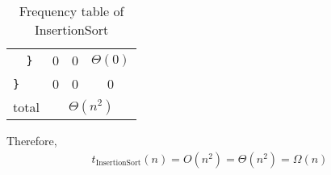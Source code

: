 \documentclass{article}
\begin{document}
\begin{table}[H]
\begin{tabular}{|l|c|c|c|}
        \verb|  }|                                        & 0                                   & 0               & $\Theta(0)$       \\
        \verb|}|                                          & 0                                   & 0               & 0                 \\
        \hline
        \multicolumn{1}{|c|}{total}                       & \multicolumn{3}{|c|}{$\Theta(n^2)$}                                       \\
        \hline
    \end{tabular}
    \caption{Frequency table of InsertionSort}
\end{table}

Therefore,
\begin{align}
    \boxed{t_{\text{InsertionSort}}(n) = O(n^2) = \Theta(n^2) = \Omega(n)}
\end{align}
\end{document}
